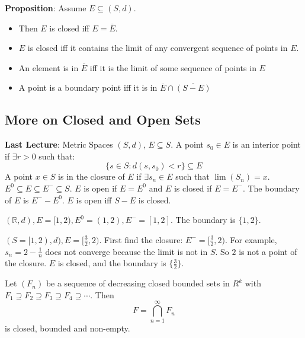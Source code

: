 \documentclass{report}
\begin{document}
\textbf{Proposition}: Assume $E \subseteq (S, d)$.
    \begin{itemize}
        \item Then $E$ is closed iff $E = \overline{E}$.

        \item $E$ is closed iff it contains the limit of any convergent sequence of points in $E$.

        \item An element is in $\overline{E}$ iff it is the limit of some sequence of points in $E$

        \item A point is a boundary point iff it is in $\overline{E} \cap \overline{(S - E)}$ 
    \end{itemize}

\begin{topic}
    \section{More on Closed and Open Sets}
\end{topic}

\textbf{Last Lecture}: Metric Spaces $(S, d)$, $E \subseteq S$. A point $s_{0} \in E$ is an interior point if $\exists  r > 0$ such that:
    \begin{equation*}
        \{s \in S : d(s, s_{0}) < r\} \subseteq E
    \end{equation*}
A point $x \in S$ is in the closure of $E$ if $\exists s_{n} \in E$ such that $\lim(S_{n}) = x$. $E^{0} \subseteq E \subseteq E^{-} \subseteq S$. $E$ is open if $E = E^{0}$ and $E$ is closed if $E =  E^{-}$. The boundary of $E$ is $E^{-} - E^{0}$. $E$ is open iff $S - E$ is closed.

\begin{examples}
    \begin{example}
        $(\mathbb{R}, d), E = [1, 2), E^{0} = (1, 2), E^{-} = [1, 2]$. The boundary is $\{1, 2\}$.
    \end{example}
    \begin{example}
        $(S = [1, 2), d), E = [\frac{3}{2}, 2)$. First find the closure: $E^{-} = [\frac{3}{2}, 2)$. For example, $s_{n} = 2 - \frac{1}{n}$ does not converge because the limit is not in $S$. So $2$ is not a point of the closure. $E$ is closed, and the boundary is $\{\frac{3}{2}\}$.
    \end{example}
\end{examples}

\begin{theorem}{}
    Let $(F_{n})$ be a sequence of decreasing closed bounded sets in $R^{k}$ with $F_{1} \supseteq F_{2} \supseteq F_{3} \supseteq F_{4} \supseteq \cdots $. Then
        \begin{equation*}
            F = \bigcap_{n = 1}^{\infty} F_{n}
        \end{equation*}
    is closed, bounded and non-empty.
\end{theorem}
\end{document}
